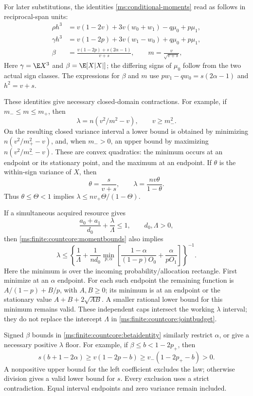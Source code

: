 For later substitutions, the identities \eqref{ms:conditional-moments}
read as follows in reciprocal-span units:
\begin{align}
 \rho h^3&=v(1-2v)+3v(w_0+w_1)-q\mu_0+p\mu_1,
       \label{ms:finite:countcore:rhoidentity}\\
 \gamma h^3&=v(1-2p)+3v(w_1-w_0)+q\mu_0+p\mu_1,
       \label{ms:finite:countcore:gammaidentity}\\
 \beta&=\frac{v(1-2p)+s(2\alpha-1)}{v+s},\qquad
 m=\frac v{\sqrt{v+s}},
       \label{ms:finite:countcore:betaidentity}
\end{align}
Here $\gamma=\E X^3$ and $\beta=\E[X|X|]$; the differing signs
of $\mu_0$ follow from the two actual sign classes. The expressions for
$\beta$ and $m$ use $pw_1-qw_0=s(2\alpha-1)$ and $h^2=v+s$.

These identities give necessary closed-domain contractions. For example,
if \(m_-\le m\le m_+\), then
\[
 \lambda=n(v^2/m^2-v),\qquad v\ge m_-^2.
\]
On the resulting closed variance interval a lower bound is obtained by
minimizing \(n(v^2/m_+^2-v)\), and, when \(m_->0\), an upper bound
by maximizing \(n(v^2/m_-^2-v)\). These are convex quadratics: the
minimum occurs at an endpoint or its stationary point, and the maximum
at an endpoint. If \(\theta\) is the within-sign variance of \(X\), then
\[
 \theta=\frac{s}{v+s},\qquad
 \lambda=\frac{nv\theta}{1-\theta}.
\]
Thus \(\theta\le\Theta<1\) implies
\(\lambda\le nv_+\Theta/(1-\Theta)\).

If a simultaneous acquired resource gives
\begin{equation}
 \frac{a_0+a_1}{d_0}+\frac\lambda\Lambda\le1,
 \qquad d_0,\Lambda>0,
 \label{ms:finite:countcore:jointbudget}
\end{equation}
then \eqref{ms:finite:countcore:momentbounds} also implies
\[
 \lambda\le
 \left\{\frac1\Lambda+\frac1{nd_0}
 \min_{p,\alpha}\left[
 \frac{1-\alpha}{(1-p)O_0}+\frac\alpha{pO_1}\right]\right\}^{-1}.
\]
Here the minimum is over the incoming probability/allocation rectangle.
First minimize at an \(\alpha\) endpoint. For each such endpoint the
remaining function is \(A/(1-p)+B/p\), with \(A,B\ge0\); its
minimum is at an endpoint or the stationary value
\(A+B+2\sqrt{AB}\). A smaller rational lower bound for this minimum
remains valid. These independent caps intersect the working
\(\lambda\) interval; they do not replace the intercept \(\Lambda\)
in \eqref{ms:finite:countcore:jointbudget}.

Signed \(\beta\) bounds in \eqref{ms:finite:countcore:betaidentity} similarly
restrict \(\alpha\), or give a necessary positive \(\lambda\) floor.
For example, if \(\beta\le b<1-2p_+\), then
\[
 s(b+1-2\alpha)\ge v(1-2p-b)
 \ge v_-(1-2p_+-b)>0.
\]
A nonpositive upper bound for the left coefficient excludes the law;
otherwise division gives a valid lower bound for \(s\).
Every exclusion uses a strict contradiction. Equal interval endpoints
and zero variance remain included.

